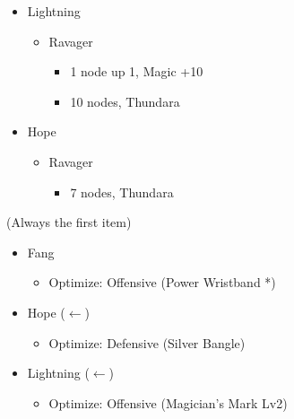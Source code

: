 \begin{multicols}{2}
\begin{menu}
\begin{itemize}
\begin{itemize}
\begin{itemize}
        \end{itemize}
        \item Lightning
        \begin{itemize}
            \item Ravager
            \begin{itemize}
                \item 1 node up 1, Magic +10
                \item 10 nodes, Thundara
            \end{itemize}
        \end{itemize}
        \item Hope
        \begin{itemize}
            \item Ravager
            \begin{itemize}
                 \item 7 nodes, Thundara
            \end{itemize}
        \end{itemize}
    \end{itemize}
    \equip (Always the first item)
    \begin{itemize}
        \item Fang
        \begin{itemize}
                \item Optimize: Offensive (Power Wristband *)
        \end{itemize}
        \item Hope ($\leftarrow$)
        \begin{itemize}
                \item Optimize: Defensive (Silver Bangle)
        \end{itemize}
        \item Lightning ($\leftarrow$)
        \begin{itemize}
                \item Optimize: Offensive (Magician's Mark Lv2)
        \end{itemize}
    \end{itemize}
\end{itemize}
\end{menu}

\renewcommand{\first}{[1] Aggression (\com/\com/\rav)}
\renewcommand{\second}{[2] Relentless Assault (\com/\rav/\rav)}
\renewcommand{\third}{[3] Smart Bomb (\sab/\rav/\rav)}
\renewcommand{\fourth}{[4] Mystic Tower (\sen/\rav/\rav)}
\renewcommand{\fifth}{[5] Guerilla (\sab/\rav/\syn)}
\renewcommand{\sixth}{[6] Relentless Assault (\com/\rav/\rav)}


\end{multicols}
